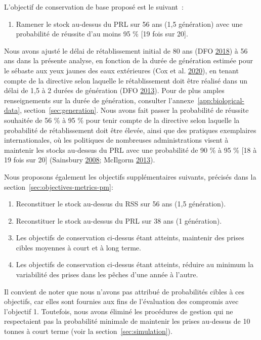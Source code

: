 \documentclass[11pt]{book}
\begin{document}
L'objectif de conservation de base proposé est le suivant~:
\begin{enumerate}
\def\labelenumi{\arabic{enumi}.}

\item
  Ramener le stock au-dessus du PRL sur 56 ans (1,5 génération) avec une probabilité de réussite d'au moins 95 \% {[}19 fois sur 20{]}.
\end{enumerate}
Nous avons ajusté le délai de rétablissement initial de 80 ans (DFO \protect\hyperlink{ref-ifmp2018}{2018}) à 56 ans dans la présente analyse, en fonction de la durée de génération estimée pour le sébaste aux yeux jaunes des eaux extérieures (Cox et al. \protect\hyperlink{ref-cox2020}{2020}), en tenant compte de la directive selon laquelle le rétablissement doit être réalisé dans un délai de 1,5 à 2 durées de génération (DFO \protect\hyperlink{ref-dfo2013}{2013}). Pour de plus amples renseignements sur la durée de génération, consulter l'annexe~\ref{app:biological-data}, section~\ref{sec:generation}. Nous avons fait passer la probabilité de réussite souhaitée de 56 \% à 95 \% pour tenir compte de la directive selon laquelle la probabilité de rétablissement doit être élevée, ainsi que des pratiques exemplaires internationales, où les politiques de nombreuses administrations visent à maintenir les stocks au-dessus du PRL avec une probabilité de 90 \% à 95 \% {[}18 à 19 fois sur 20{]} (Sainsbury \protect\hyperlink{ref-sainsbury2008}{2008}; McIlgorm \protect\hyperlink{ref-mcilgorm2013}{2013}).

Nous proposons également les objectifs supplémentaires suivants, précisés dans la section~\ref{sec:objectives-metrics-pm}:
\begin{enumerate}
\def\labelenumi{\arabic{enumi}.}
\setcounter{enumi}{1}
\item
  Reconstituer le stock au-dessus du RSS sur 56 ans (1,5 génération).
\item
  Reconstituer le stock au-dessus du PRL sur 38 ans (1 génération).
\item
  Les objectifs de conservation ci-dessus étant atteints, maintenir des prises cibles moyennes à court et à long terme.
\item
  Les objectifs de conservation ci-dessus étant atteints, réduire au minimum la variabilité des prises dans les pêches d'une année à l'autre.
\end{enumerate}
Il convient de noter que nous n'avons pas attribué de probabilités cibles à ces objectifs, car elles sont fournies aux fins de l'évaluation des compromis avec l'objectif 1. Toutefois, nous avons éliminé les procédures de gestion qui ne respectaient pas la probabilité minimale de maintenir les prises au-dessus de 10 tonnes à court terme (voir la section~\ref{sec:simulation}).
\end{document}
